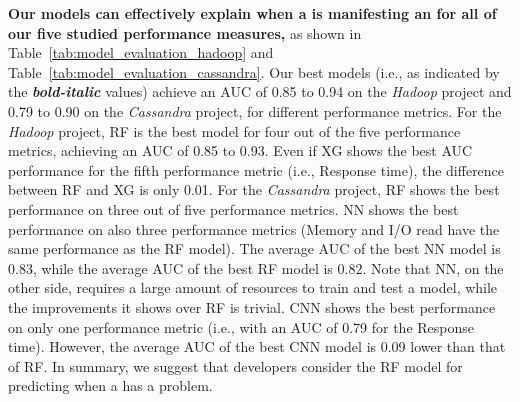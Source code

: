 
\noindent \textbf{Our models can effectively explain when a \instance is manifesting an \inconsistent for all of our five studied performance measures,} as shown in Table~\ref{tab:model_evaluation_hadoop} and Table~\ref{tab:model_evaluation_cassandra}. %
Our best models (i.e., as indicated by the \textbf{\textit{bold-italic}} values) achieve an AUC of 0.85 to 0.94 on the \emph{Hadoop} project and 0.79 to 0.90 on the \emph{Cassandra} project, for different performance metrics.
For the \emph{Hadoop} project, %
RF is the best model for four out of the five performance metrics, achieving an AUC of 0.85 to 0.93. Even if XG shows the best AUC performance for the fifth performance metric (i.e., Response time), the difference between RF and XG is only 0.01. 
For the \emph{Cassandra} project, RF shows the best performance on three out of five performance metrics. NN shows the best performance on also three performance metrics (Memory and I/O read have the same performance as the RF model). The average AUC of the best NN model is 0.83, while the average AUC of the best RF model is 0.82. 
Note that %
NN, on the other side, requires a large amount of resources to train and test a model, while the improvements it shows over RF is trivial.
CNN shows the best performance on only one performance metric (i.e., with an AUC of 0.79 for the Response time). However, the average AUC of the best CNN model is 0.09 lower than that of RF. 
In summary, we suggest that developers consider the RF model for predicting when a \instance has a \inconsistent problem. 

